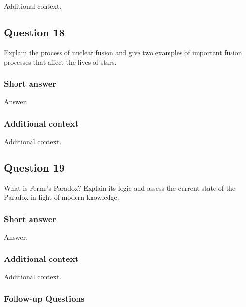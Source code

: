 \documentclass[a4paper,10pt]{article}
\begin{document}
Additional context.


\newpage
\subsection{Question 18}

Explain the process of nuclear fusion and give two examples of important fusion processes that affect the lives of stars.

\subsubsection{Short answer}

Answer.

\subsubsection{Additional context}

Additional context.


\newpage
\subsection{Question 19}

What is Fermi’s Paradox? Explain its logic and assess the current state of the Paradox in light of modern knowledge.

\subsubsection{Short answer}

Answer.

\subsubsection{Additional context}

Additional context.

\subsubsection{Follow-up Questions}
\end{document}
